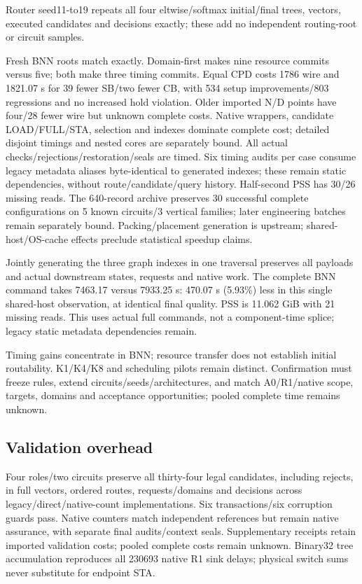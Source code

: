 \documentclass[conference,10pt]{IEEEtran}
\begin{document}
Router seed11-to19 repeats all four eltwise/softmax initial/final trees, vectors, executed candidates and decisions exactly; these add no independent routing-root or circuit samples.

Fresh BNN roots match exactly. Domain-first makes nine resource commits versus five; both make three timing commits. Equal CPD costs 1786 wire and 1821.07 s for 39 fewer SB/two fewer CB, with 534 setup improvements/803 regressions and no increased hold violation. Older imported N/D points have four/28 fewer wire but unknown complete costs. Native wrappers, candidate LOAD/FULL/STA, selection and indexes dominate complete cost; detailed disjoint timings and nested cores are separately bound. All actual checks/rejections/restoration/seals are timed. Six timing audits per case consume legacy metadata aliases byte-identical to generated indexes; these remain static dependencies, without route/candidate/query history. Half-second PSS has 30/26 missing reads. The 640-record archive preserves 30 successful complete configurations on 5 known circuits/3 vertical families; later engineering batches remain separately bound. Packing/placement generation is upstream; shared-host/OS-cache effects preclude statistical speedup claims.

Jointly generating the three graph indexes in one traversal preserves all payloads and actual downstream states, requests and native work. The complete BNN command takes 7463.17 versus 7933.25 s: 470.07 s (5.93\%) less in this single shared-host observation, at identical final quality. PSS is 11.062 GiB with 21 missing reads. This uses actual full commands, not a component-time splice; legacy static metadata dependencies remain.

Timing gains concentrate in BNN; resource transfer does not establish initial routability. K1/K4/K8 and scheduling pilots remain distinct. Confirmation must freeze rules, extend circuits/seeds/architectures, and match A0/R1/native scope, targets, domains and acceptance opportunities; pooled complete time remains unknown.

\subsection{Validation overhead}
Four roles/two circuits preserve all thirty-four legal candidates, including rejects, in full vectors, ordered routes, requests/domains and decisions across legacy/direct/native-count implementations. Six transactions/six corruption guards pass. Native counters match independent references but remain native assurance, with separate final audits/context seals. Supplementary receipts retain imported validation costs; pooled complete costs remain unknown. Binary32 tree accumulation reproduces all 230693 native R1 sink delays; physical switch sums never substitute for endpoint STA.
\end{document}
